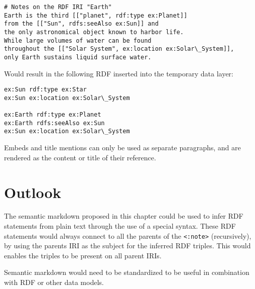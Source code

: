\begin{verbatim}
# Notes on the RDF IRI "Earth"
Earth is the third [["planet", rdf:type ex:Planet]] 
from the [["Sun", rdfs:seeAlso ex:Sun]] and 
the only astronomical object known to harbor life.
While large volumes of water can be found 
throughout the [["Solar System", ex:location ex:Solar\_System]], 
only Earth sustains liquid surface water.
\end{verbatim}

Would result in the following RDF inserted into the temporary data layer:

\begin{verbatim}
ex:Sun rdf:type ex:Star
ex:Sun ex:location ex:Solar\_System

ex:Earth rdf:type ex:Planet
ex:Earth rdfs:seeAlso ex:Sun
ex:Sun ex:location ex:Solar\_System
\end{verbatim}


Embeds and title mentions can only be used as separate paragraphs, and are rendered as the content or title of their reference.

\section{Outlook}

The semantic markdown proposed in this chapter could be used to infer RDF statements from plain text through the use of a special syntax. These RDF statements would always connect to all the parents of the \verb|<:note>| (recursively), by using the parents IRI as the subject for the inferred RDF triples. This would enables the triples to be present on all parent IRIs.

Semantic markdown would need to be standardized to be useful in combination with RDF or other data models.

